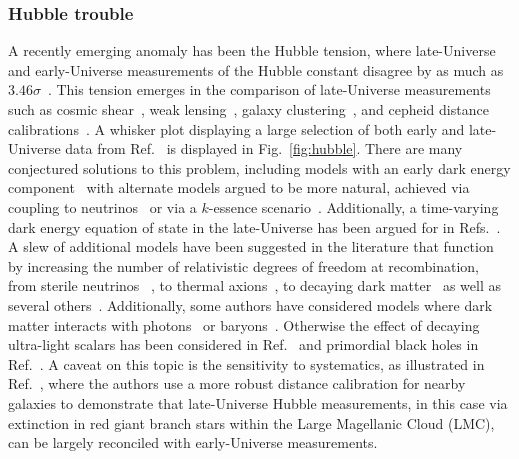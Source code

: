 \documentclass[10pt]{article}
\begin{document}
\subsubsection{Hubble trouble}
%
A recently emerging anomaly has been the Hubble tension, where late-Universe and early-Universe measurements of the Hubble constant disagree by as much as $3.46\sigma$~\cite{DiValentino:2021izs}. This tension emerges in the comparison of late-Universe measurements such as cosmic shear~\cite{Hildebrandt:2018yau,KiDS:2020suj}, weak lensing~\cite{Joudaki:2016kym,Hildebrandt:2016iqg},  galaxy clustering~\cite{DES:2017myr}, and cepheid distance calibrations~\cite{Riess:2020fzl}. A whisker plot displaying a large selection of both early and late-Universe data from Ref.~\cite{DiValentino:2021izs} is displayed in Fig.~\ref{fig:hubble}. There are many conjectured solutions to this problem, including models with an early dark energy component~\cite{Caldwell:2003vp,Doran:2005sn,Bartelmann:2005fc,Karwal:2016vyq} with alternate models argued to be more natural, achieved via coupling to neutrinos~\cite{Sakstein:2019fmf,Gogoi:2020qif,Fardon:2003eh,Kaplan:2004dq,Peccei:2004sz} or via a $k$-essence scenario~\cite{Tian:2021omz}. Additionally, a time-varying dark energy equation of state in the late-Universe has been argued for in Refs.~\cite{Zhao:2017cud,DiValentino:2017gzb}. A slew of additional models have been suggested in the literature that function by increasing the number of relativistic degrees of freedom at recombination, from sterile neutrinos ~\cite{Carneiro:2018xwq,Gelmini:2019deq,Gelmini:2020ekg}, to thermal axions~\cite{DEramo:2018vss}, to decaying dark matter~\cite{Xiao:2019ccl,Nygaard:2020sow,Blinov:2020uvz} as well as several others~\cite{DiValentino:2021izs}. Additionally, some authors have considered models where dark matter interacts with photons~\cite{Kumar:2018yhh,Yadav:2019jio} or baryons~\cite{Becker:2020hzj}. Otherwise the effect of decaying ultra-light scalars has been considered in Ref.~\cite{Gonzalez:2020fdy} and primordial black holes in Ref.~\cite{Nesseris:2019fwr}. A caveat on this topic is the sensitivity to systematics, as illustrated in Ref.~\cite{Freedman:2020dne}, where the authors use a more robust distance calibration for nearby galaxies to demonstrate that late-Universe Hubble measurements, in this case via extinction in red giant branch stars within the Large Magellanic Cloud (LMC), can be largely reconciled with early-Universe measurements.  
\end{document}
